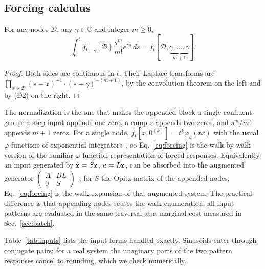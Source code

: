 \subsection{Forcing calculus}
\begin{proposition}\label{prop:forcing}
For any nodes $\mathcal{D}$, any $\gamma\in\mathbb{C}$ and integer $m\ge0$,
\begin{equation}\label{eq:forcing}
\int_0^t f_{t-s}[\mathcal{D}]\,\frac{s^m}{m!}e^{\gamma s}\,ds=f_t[\mathcal{D},\underbrace{\gamma,\dots,\gamma}_{m+1}].
\end{equation}
\end{proposition}
\begin{proof}
Both sides are continuous in $t$. Their Laplace transforms are $\prod_{x\in\mathcal{D}}(s-x)^{-1}\cdot(s-\gamma)^{-(m+1)}$, by the convolution theorem on the left and by (D2) on the right.
\end{proof}
The normalization is the one that makes the appended block a single confluent group: a step input appends one zero, a ramp $s$ appends two zeros, and $s^m/m!$ appends $m+1$ zeros. For a single node, $f_t[x,0^{(k)}]=t^k\varphi_k(tx)$ with the usual $\varphi$-functions of exponential integrators~\cite{hochbruck2010,niesen2012}, so Eq.~\eqref{eq:forcing} is the walk-by-walk version of the familiar $\varphi$-function representation of forced responses. Equivalently, an input generated by $\dot{{\bf z}}=S{\bf z}$, $u=L{\bf z}$, can be absorbed into the augmented generator $\left(\begin{smallmatrix}A&BL\\0&S\end{smallmatrix}\right)$~\cite{vanloan1978,almohy2011}; for $S$ the Opitz matrix of the appended nodes, Eq.~\eqref{eq:forcing} is the walk expansion of that augmented system. The practical difference is that appending nodes reuses the walk enumeration: all input patterns are evaluated in the same traversal at a marginal cost measured in Sec.~\ref{sec:batch}.

Table~\ref{tab:inputs} lists the input forms handled exactly. Sinusoids enter through conjugate pairs; for a real system the imaginary parts of the two pattern responses cancel to rounding, which we check numerically.

